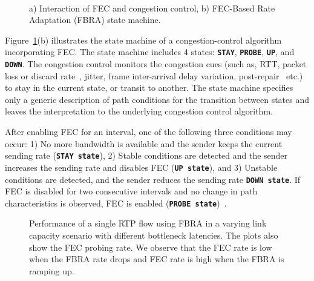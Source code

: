 \begin{figure}[!t]
  \centering
   \\
\caption{a) Interaction of FEC and congestion control, b) FEC-Based Rate
Adaptation (FBRA) state machine.}
\label{fig:fecrc-intro}
\end{figure}


Figure~\ref{fig:fecrc-intro}(b) illustrates the state machine of a
congestion-control algorithm incorporating FEC. The state machine includes 4
states: \texttt{\textbf{STAY}}, \texttt{\textbf{PROBE}}, \texttt{\textbf{UP}},
and \texttt{\textbf{DOWN}}. The congestion control monitors the congestion
cues (such as, RTT, packet loss or discard rate~\cite{rfc7002, rfc7097, rfc7243},
jitter, frame inter-arrival delay variation,
post-repair~\cite{rfc5725, draft.xr.post.repair} etc.) to stay in the current state,
or transit to another. The state machine specifies only a generic description of path
conditions for the transition between states and leaves the interpretation to
the underlying congestion control algorithm.

After enabling FEC for an interval, one of the following three conditions may
occur: 1) No more bandwidth is available and the sender keeps the current sending
rate (\texttt{\textbf{STAY state}}), 2) Stable conditions are detected and the
sender increases the sending rate and disables FEC (\texttt{\textbf{UP
state}}), and 3) Unstable conditions are detected, and the sender reduces the
sending rate \texttt{\textbf{DOWN state}}. If FEC is disabled for two consecutive
intervals and no change in path characteristics is observed, FEC is enabled
(\texttt{\textbf{PROBE state}})~\cite{draft.adaptive.fec}.


\begin{figure}[!t]
\caption{Performance of a single RTP flow using FBRA in a
varying link capacity scenario with different bottleneck latencies. The plots
also show the FEC probing rate. We observe that the FEC rate is low when the
FBRA rate drops and FEC rate is high when the FBRA is ramping up.}
\label{fig:fecrc-var}
\end{figure}

